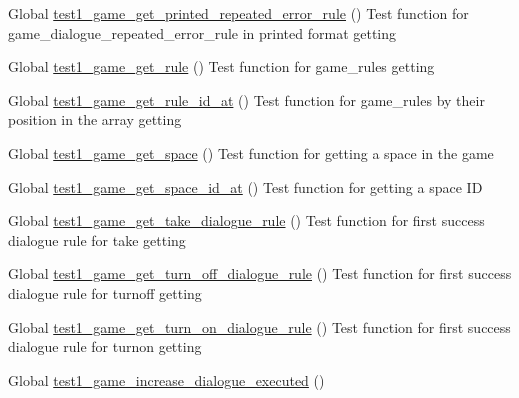 \begin{DoxyRefList}
\item[Global \mbox{\hyperlink{game__test_8c_aba1c9b2e24b23ecda5d24322ea834221}{test1\+\_\+game\+\_\+get\+\_\+printed\+\_\+repeated\+\_\+error\+\_\+rule}} ()]\label{test__test000321}%
%
Test function for game\+\_\+dialogue\+\_\+repeated\+\_\+error\+\_\+rule in printed format getting  
\item[Global \mbox{\hyperlink{game__test_8c_a65aefeb9dc69f182d54336c7e0032edb}{test1\+\_\+game\+\_\+get\+\_\+rule}} ()]\label{test__test000399}%
%
Test function for game\+\_\+rules getting  
\item[Global \mbox{\hyperlink{game__test_8c_a18b1c8813fe8f0aa9ed2a32e5b2d965b}{test1\+\_\+game\+\_\+get\+\_\+rule\+\_\+id\+\_\+at}} ()]\label{test__test000403}%
%
Test function for game\+\_\+rules by their position in the array getting  
\item[Global \mbox{\hyperlink{game__test_8c_acc05e3dc9b82dbd4566c26a039646df9}{test1\+\_\+game\+\_\+get\+\_\+space}} ()]\label{test__test000209}%
%
Test function for getting a space in the game  
\item[Global \mbox{\hyperlink{game__test_8c_a07774817719d7d44808f110fdec1f585}{test1\+\_\+game\+\_\+get\+\_\+space\+\_\+id\+\_\+at}} ()]\label{test__test000218}%
%
Test function for getting a space ID  
\item[Global \mbox{\hyperlink{game__test_8c_ace4c3bc1904a8d07ec85bfeec6f0f66e}{test1\+\_\+game\+\_\+get\+\_\+take\+\_\+dialogue\+\_\+rule}} ()]\label{test__test000335}%
%
Test function for first success dialogue rule for take getting  
\item[Global \mbox{\hyperlink{game__test_8c_a100513fdd593e1b20991c3a91890d772}{test1\+\_\+game\+\_\+get\+\_\+turn\+\_\+off\+\_\+dialogue\+\_\+rule}} ()]\label{test__test000361}%
%
Test function for first success dialogue rule for turnoff getting  
\item[Global \mbox{\hyperlink{game__test_8c_a6ae06d361ed884b0dd687b8f143fdaff}{test1\+\_\+game\+\_\+get\+\_\+turn\+\_\+on\+\_\+dialogue\+\_\+rule}} ()]\label{test__test000355}%
%
Test function for first success dialogue rule for turnon getting  
\item[Global \mbox{\hyperlink{game__test_8c_a82a64e72ad6daceed5f22c23b93b44d8}{test1\+\_\+game\+\_\+increase\+\_\+dialogue\+\_\+executed}} ()]\label{test__test000303}%

\end{DoxyRefList}
